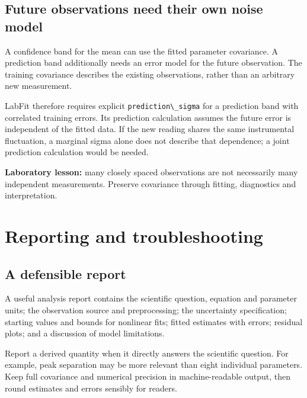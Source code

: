 \documentclass[
  british,
  10pt,
  a4paper,
]{article}
\newcommand{\passthrough}[1]{#1}
\begin{document}

\subsection{Future observations need their own noise
model}\label{future-observations-need-their-own-noise-model}

A confidence band for the mean can use the fitted parameter covariance.
A prediction band additionally needs an error model for the future
observation. The training covariance describes the existing
observations, rather than an arbitrary new measurement.

LabFit therefore requires explicit
\passthrough{\lstinline!prediction\_sigma!} for a prediction band with
correlated training errors. Its prediction calculation assumes the
future error is independent of the fitted data. If the new reading
shares the same instrumental fluctuation, a marginal sigma alone does
not describe that dependence; a joint prediction calculation would be
needed.

\textbf{Laboratory lesson:} many closely spaced observations are not
necessarily many independent measurements. Preserve covariance through
fitting, diagnostics and interpretation.

\clearpage

\section{Reporting and
troubleshooting}\label{reporting-and-troubleshooting}


\subsection{A defensible report}\label{a-defensible-report}

A useful analysis report contains the scientific question, equation and
parameter units; the observation source and preprocessing; the
uncertainty specification; starting values and bounds for nonlinear
fits; fitted estimates with errors; residual plots; and a discussion of
model limitations.

Report a derived quantity when it directly answers the scientific
question. For example, peak separation may be more relevant than eight
individual parameters. Keep full covariance and numerical precision in
machine-readable output, then round estimates and errors sensibly for
readers.
\end{document}

